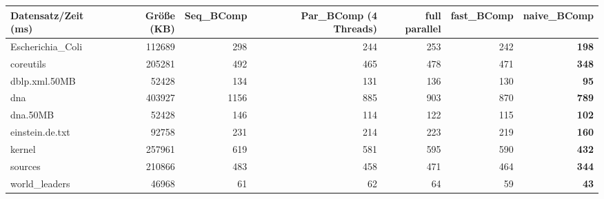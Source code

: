 \documentclass[10pt,a4paper]{standalone}
\begin{document}
	
	
	\begin{tabular}{l|r|r|r|r|r|r}
		Datensatz/Zeit (ms) & Größe (KB) & Seq\_BComp & Par\_BComp (4 Threads) & full parallel & fast\_BComp & naive\_BComp \\ \hline
  Escherichia\_Coli & 112689 &  298 & 244 & 253 & 242 & \textbf{198} \\
          coreutils & 205281 &  492 & 465 & 478 & 471 & \textbf{348} \\
      dblp.xml.50MB &  52428 &  134 & 131 & 136 & 130 &  \textbf{95} \\
                dna & 403927 & 1156 & 885 & 903 & 870 & \textbf{789} \\
           dna.50MB &  52428 &  146 & 114 & 122 & 115 & \textbf{102} \\
    einstein.de.txt &  92758 &  231 & 214 & 223 & 219 & \textbf{160} \\
             kernel & 257961 &  619 & 581 & 595 & 590 & \textbf{432} \\
            sources & 210866 &  483 & 458 & 471 & 464 & \textbf{344} \\
     world\_leaders &  46968 &   61 &  62 &  64 &  59 &  \textbf{43} \\
	\end{tabular}
\end{document}
